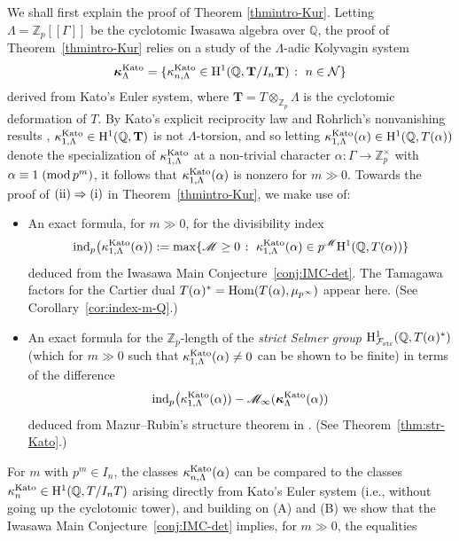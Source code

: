 \documentclass[10pt,reqno]{amsart}
\numberwithin{equation}{section}
\theoremstyle{plain}
\theoremstyle{definition}
\theoremstyle{definition}
\theoremstyle{plain}
\theoremstyle{plain}
\theoremstyle{plain}
\theoremstyle{plain}
\theoremstyle{plain}
\theoremstyle{plain}
\newcommand{\Z}{\mathbb{Z}}
\newcommand{\Q}{\mathbb{Q}}
\newcommand{\Fcal}{\mathcal{F}}
\newcommand{\rH}{\mathrm{H}}
\begin{document}
We shall first explain the proof of Theorem \ref{thmintro-Kur}. Letting $\Lambda=\Z_p[[\Gamma]]$ be the cyclotomic Iwasawa algebra over $\Q$, the proof of Theorem~\ref{thmintro-Kur} relies on a study of the $\Lambda$-adic Kolyvagin system 
\[
\boldsymbol{\kappa}_\Lambda^{\rm Kato}=\{{\kappa}_{n,\Lambda}^{\rm Kato}\in\rH^1(\Q,\mathbf{T}/I_n\mathbf{T})\;\colon\;n\in\mathcal{N}\}
\]
derived from Kato's Euler system, where $\mathbf{T}=T\otimes_{\Z_p}\Lambda$ is the cyclotomic deformation of $T$. By Kato's explicit reciprocity law \cite{kato-euler-systems} and Rohrlich's nonvanishing results \cite{rohrlich-cyc}, ${\kappa}^{\rm Kato}_{1,\Lambda}\in\rH^1(\Q,\mathbf{T})$ is not $\Lambda$-torsion, and so letting ${\kappa}_{1,\Lambda}^{\rm Kato}(\alpha)\in\rH^1(\Q,T(\alpha))$ denote the specialization of ${\kappa}_{1,\Lambda}^{\rm Kato}$ at a non-trivial character $\alpha:\Gamma\rightarrow\Z_p^\times$ with $\alpha\equiv 1\;({\rm mod}\,p^m)$, it follows that ${\kappa}_{1,\Lambda}^{\rm Kato}(\alpha)$ is nonzero for $m\gg 0$. Towards the proof of ${\rm (ii)}\Rightarrow{\rm (i)}$ in Theorem~\ref{thmintro-Kur}, we make use of:
\begin{itemize}
\item[(A)] An exact formula, for $m\gg 0$, for the divisibility index 
\[
{\rm ind}_p\bigl({\kappa}_{1,\Lambda}^{\rm Kato}(\alpha)):=\max\{\mathscr{M}\geq 0\;\colon\;{\kappa}_{1,\Lambda}^{\rm Kato}(\alpha)\in p^\mathscr{M}\rH^1(\Q,T(\alpha))\}
\]
deduced from the Iwasawa Main Conjecture~\ref{conj:IMC-det}. The Tamagawa factors for the Cartier dual $T(\alpha)^*={\rm Hom}(T(\alpha),\mu_{p^\infty})$ appear here. (See Corollary~\ref{cor:index-m-Q}.)
\item[(B)] An exact formula for the $\Z_p$-length of the \emph{strict Selmer group} $\rH^1_{\Fcal_{\rm str}}(\Q,T(\alpha)^*)$ (which for $m\gg 0$ such that $\kappa_{1,\Lambda}^{\rm Kato}(\alpha)\neq 0$ can be shown to be finite) in terms of the difference 
\[
{\rm ind}_p\bigl({\kappa}_{1,\Lambda}^{\rm Kato}(\alpha))-\mathscr{M}_\infty(\boldsymbol{\kappa}_\Lambda^{\rm Kato}(\alpha))
\]
deduced from Mazur--Rubin's structure theorem in \cite{mazrub}. (See Theorem~\ref{thm:str-Kato}.)
\end{itemize}
For $m$ with $p^m\in I_n$, the classes ${\kappa}_{n,\Lambda}^{\rm Kato}(\alpha)$ can be compared to the classes $\kappa_n^{\rm Kato}\in\rH^1(\Q,T/I_nT)$ arising directly from Kato's Euler system (i.e., without going up the cyclotomic tower), and building on (A) and (B) we show that the Iwasawa Main Conjecture~\ref{conj:IMC-det} implies, for $m\gg 0$, the equalities
\end{document}
